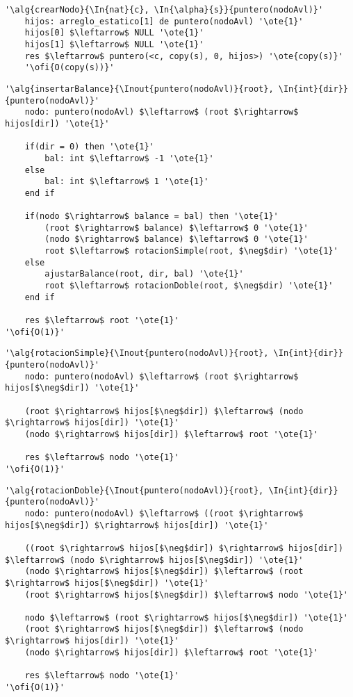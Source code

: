 \begin{lstlisting}[mathescape]
'\alg{crearNodo}{\In{nat}{c}, \In{\alpha}{s}}{puntero(nodoAvl)}'
	hijos: arreglo_estatico[1] de puntero(nodoAvl) '\ote{1}'
	hijos[0] $\leftarrow$ NULL '\ote{1}'
	hijos[1] $\leftarrow$ NULL '\ote{1}'
	res $\leftarrow$ puntero(<c, copy(s), 0, hijos>) '\ote{copy(s)}'
	'\ofi{O(copy(s))}'
\end{lstlisting}

\begin{lstlisting}[mathescape]
'\alg{insertarBalance}{\Inout{puntero(nodoAvl)}{root}, \In{int}{dir}}{puntero(nodoAvl)}'
	nodo: puntero(nodoAvl) $\leftarrow$ (root $\rightarrow$ hijos[dir]) '\ote{1}'

	if(dir = 0) then '\ote{1}'
		bal: int $\leftarrow$ -1 '\ote{1}'
	else
		bal: int $\leftarrow$ 1 '\ote{1}'
	end if

	if(nodo $\rightarrow$ balance = bal) then '\ote{1}'
		(root $\rightarrow$ balance) $\leftarrow$ 0 '\ote{1}'
		(nodo $\rightarrow$ balance) $\leftarrow$ 0 '\ote{1}'
		root $\leftarrow$ rotacionSimple(root, $\neg$dir) '\ote{1}'
	else
		ajustarBalance(root, dir, bal) '\ote{1}'
		root $\leftarrow$ rotacionDoble(root, $\neg$dir) '\ote{1}'
	end if

	res $\leftarrow$ root '\ote{1}'
'\ofi{O(1)}'
\end{lstlisting}

\begin{lstlisting}[mathescape]
'\alg{rotacionSimple}{\Inout{puntero(nodoAvl)}{root}, \In{int}{dir}}{puntero(nodoAvl)}'
	nodo: puntero(nodoAvl) $\leftarrow$ (root $\rightarrow$ hijos[$\neg$dir]) '\ote{1}'

	(root $\rightarrow$ hijos[$\neg$dir]) $\leftarrow$ (nodo $\rightarrow$ hijos[dir]) '\ote{1}'
	(nodo $\rightarrow$ hijos[dir]) $\leftarrow$ root '\ote{1}'
	
	res $\leftarrow$ nodo '\ote{1}'	
'\ofi{O(1)}'
\end{lstlisting}

\begin{lstlisting}[mathescape]
'\alg{rotacionDoble}{\Inout{puntero(nodoAvl)}{root}, \In{int}{dir}}{puntero(nodoAvl)}'
	nodo: puntero(nodoAvl) $\leftarrow$ ((root $\rightarrow$ hijos[$\neg$dir]) $\rightarrow$ hijos[dir]) '\ote{1}'

	((root $\rightarrow$ hijos[$\neg$dir]) $\rightarrow$ hijos[dir]) $\leftarrow$ (nodo $\rightarrow$ hijos[$\neg$dir]) '\ote{1}'
	(nodo $\rightarrow$ hijos[$\neg$dir]) $\leftarrow$ (root $\rightarrow$ hijos[$\neg$dir]) '\ote{1}'
	(root $\rightarrow$ hijos[$\neg$dir]) $\leftarrow$ nodo '\ote{1}'

	nodo $\leftarrow$ (root $\rightarrow$ hijos[$\neg$dir]) '\ote{1}'
	(root $\rightarrow$ hijos[$\neg$dir]) $\leftarrow$ (nodo $\rightarrow$ hijos[dir]) '\ote{1}'
	(nodo $\rightarrow$ hijos[dir]) $\leftarrow$ root '\ote{1}'

	res $\leftarrow$ nodo '\ote{1}'	
'\ofi{O(1)}'
\end{lstlisting}

